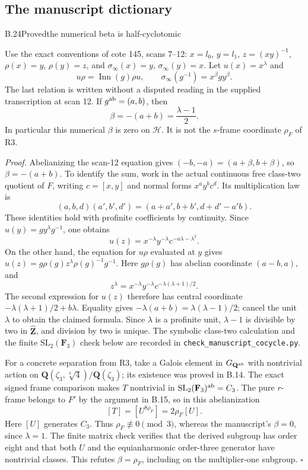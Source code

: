 \subsection{The manuscript dictionary}


\begin{statement}{B.24}{Proved}{the numerical beta is half-cyclotomic}
\end{statement}
Use the exact conventions of cote 145, scans 7--12:
$x=l_0$, $y=l_1$, $z=(xy)^{-1}$,
$\rho(x)=y$, $\rho(y)=z$, and
$\sigma_\infty(x)=y$, $\sigma_\infty(y)=x$.
Let $u(x)=x^\lambda$ and
\[
 u\rho=\operatorname{Inn}(g)\rho u,
 \qquad
 \sigma_\infty(g^{-1})=x^\beta g y^\beta.
\]
The last relation is written without a disputed reading in the
supplied transcription at scan 12. If $g^{\rm ab}=(a,b)$,
then
\[
 \beta=-(a+b)=\frac{\lambda-1}{2}.
\]
In particular this numerical $\beta$ is zero on $\mathcal H$.
It is not the $s$-frame coordinate $\rho_F$ of R3.

\emph{Proof.}
Abelianizing the scan-12 equation gives
$(-b,-a)=(a+\beta,b+\beta)$, so $\beta=-(a+b)$.
To identify the sum, work in the actual continuous free
class-two quotient of $F$, writing $c=[x,y]$ and normal forms
$x^ay^bc^d$. Its multiplication law is
\[
 (a,b,d)(a',b',d')=(a+a',b+b',d+d'-a'b).
\]
These identities hold with profinite coefficients by continuity.
Since $u(y)=gy^\lambda g^{-1}$, one obtains
\[
 u(z)=x^{-\lambda}y^{-\lambda}
                        c^{-a\lambda-\lambda^2}.
\]
On the other hand, the equation for $u\rho$ evaluated at $y$
gives $u(z)=g\rho(g)z^\lambda\rho(g)^{-1}g^{-1}$.
Here $g\rho(g)$ has abelian coordinate $(a-b,a)$, and
\[
 z^\lambda=x^{-\lambda}y^{-\lambda}
                         c^{-\lambda(\lambda+1)/2}.
\]
The second expression for $u(z)$ therefore has central
coordinate $-\lambda(\lambda+1)/2+b\lambda$.
Equality gives
$-\lambda(a+b)=\lambda(\lambda-1)/2$; cancel the unit
$\lambda$ to obtain the claimed formula. Since $\lambda$
is a profinite unit, $\lambda-1$ is divisible by two in
$\widehat{\mathbf Z}$, and division by two is unique.
The symbolic class-two calculation and the finite
$\mathrm{SL}_2(\mathbf F_3)$ check below are recorded in
\texttt{check\_manuscript\_cocycle.py}.

For a concrete separation from R3, take a Galois element in
$G_{\mathbf Q^{\rm ab}}$ with nontrivial action on
$\mathbf Q(\zeta_3,\sqrt[3]4)/\mathbf Q(\zeta_3)$; its
existence was proved in B.14. The exact signed frame comparison
makes $T$ nontrivial in
$\mathrm{SL}_2(\mathbf F_3)^{\rm ab}=C_3$. The pure $r$-frame
belongs to $F'$ by the argument in B.15, so in this abelianization
\[
                   [T]=[U^{8\rho_F}]=2\rho_F[U].
\]
Here $[U]$ generates $C_3$. Thus $\rho_F\not\equiv0\pmod3$,
whereas the manuscript's $\beta=0$, since $\lambda=1$.
The finite matrix check verifies that the derived subgroup
has order eight and that both $U$ and the equianharmonic
order-three generator have nontrivial classes. This refutes
$\beta=\rho_F$, including on the multiplier-one subgroup.
\hfill$\square$

